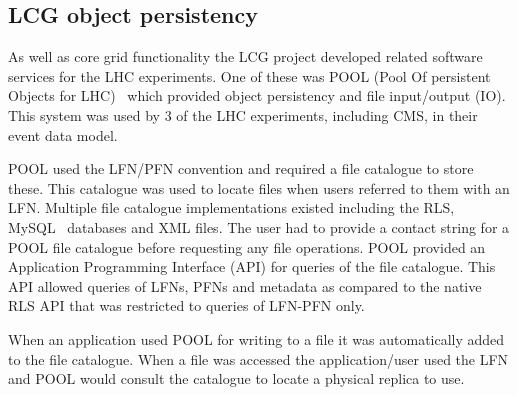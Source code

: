 
\subsection{LCG object persistency}
As well as core grid functionality the LCG project developed related software services for the LHC experiments. One of these was POOL (Pool Of persistent Objects for LHC)~\cite{citeulike:899448} which provided object persistency and file input/output (IO). This system was used by 3 of the LHC experiments, including CMS, in their event data model.

POOL used the LFN/PFN convention and required a file catalogue to store these. This catalogue was used to locate files when users referred to them with an LFN. Multiple file catalogue implementations existed including the RLS, MySQL~\cite{citeulike:835488} databases and XML files. The user had to provide a contact string for a POOL file catalogue before requesting any file operations. POOL provided an Application Programming Interface (API) for queries of the file catalogue. This API allowed queries of LFNs, PFNs and metadata as compared to the native RLS API that was restricted to queries of LFN-PFN only.

When an application used POOL for writing to a file it was automatically added to the file catalogue. When a file was accessed the application/user used the LFN and POOL would consult the catalogue to locate a physical replica to use.



